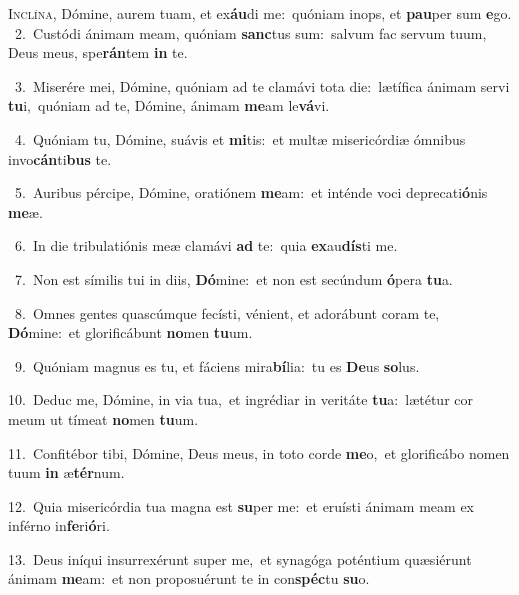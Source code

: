 \lettrine{\initial\textcolor{\initialcolor}{I}}{nclína,} Dómine, aurem tuam, et ex\-\textbf{áu}\-di me:~\star quóniam inops, et \textbf{pau}\-per sum \textbf{e}\-go.\\
{\numbfont\textcolor{\numbcolor}{~2.}}~Custódi ánimam meam, quóniam \textbf{sanc}\-tus sum:~\star salvum fac servum tuum, Deus meus, spe\-\textbf{rán}\-tem \textbf{in} te.\par
{\numbfont\textcolor{\numbcolor}{~3.}}~Miserére mei, Dómine, quóniam ad te clamávi tota die:~\dagger lætífica ánimam servi \textbf{tu}\-i,~\star quóniam ad te, Dómine, ánimam \textbf{me}\-am le\-\textbf{vá}\-vi.\par
{\numbfont\textcolor{\numbcolor}{~4.}}~Quóniam tu, Dómine, suávis et \textbf{mi}\-tis:~\star et multæ misericórdiæ ómnibus invo\-\textbf{cán}\-ti\textbf{bus} te.\par
{\numbfont\textcolor{\numbcolor}{~5.}}~Auribus pércipe, Dómine, oratiónem \textbf{me}\-am:~\star et inténde voci deprecati\-\textbf{ó}\-nis \textbf{me}\-æ.\par
{\numbfont\textcolor{\numbcolor}{~6.}}~In die tribulatiónis meæ clamávi \textbf{ad} te:~\star quia \textbf{ex}\-au\-\textbf{dís}\-ti me.\par
{\numbfont\textcolor{\numbcolor}{~7.}}~Non est símilis tui in diis, \textbf{Dó}\-mine:~\star et non est secúndum \textbf{ó}\-pera \textbf{tu}\-a.\par
{\numbfont\textcolor{\numbcolor}{~8.}}~Omnes gentes quascúmque fecísti, vénient, et adorábunt coram te, \textbf{Dó}\-mine:~\star et glorificábunt \textbf{no}\-men \textbf{tu}\-um.\par
{\numbfont\textcolor{\numbcolor}{~9.}}~Quóniam magnus es tu, et fáciens mira\-\textbf{bí}\-lia:~\star tu es \textbf{De}\-us \textbf{so}\-lus.\par
{\numbfont\textcolor{\numbcolor}{10.}}~Deduc me, Dómine, in via tua,~\dagger et ingrédiar in veritáte \textbf{tu}\-a:~\star lætétur cor meum ut tímeat \textbf{no}\-men \textbf{tu}\-um.\par
{\numbfont\textcolor{\numbcolor}{11.}}~Confitébor tibi, Dómine, Deus meus, in toto corde \textbf{me}\-o,~\star et glorificábo nomen tuum \textbf{in} æ\-\textbf{tér}\-num.\par
{\numbfont\textcolor{\numbcolor}{12.}}~Quia misericórdia tua magna est \textbf{su}\-per me:~\star et eruísti ánimam meam ex inférno in\-\textbf{fe}\-ri\-\textbf{ó}\-ri.\par
{\numbfont\textcolor{\numbcolor}{13.}}~Deus iníqui insurrexérunt super me,~\dagger et synagóga poténtium quæsiérunt ánimam \textbf{me}\-am:~\star et non proposuérunt te in con\-\textbf{spéc}\-tu \textbf{su}\-o.\par
